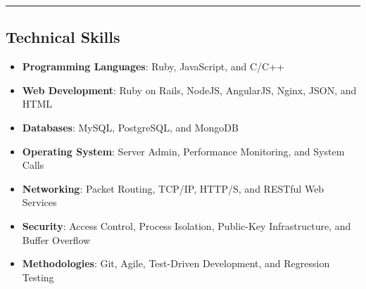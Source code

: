 \documentclass[12pt,letterpaper]{article}
\begin{document}


\noindent\rule{7.5in}{0.4pt}

\subsection*{Technical Skills}

\begin{itemize}

  \item\textbf{Programming Languages}: Ruby, JavaScript, and C/C++
  \item\textbf{Web Development}: Ruby on Rails, NodeJS, AngularJS, Nginx, JSON, and HTML
  \item\textbf{Databases}: MySQL, PostgreSQL, and MongoDB
  \item\textbf{Operating System}: Server Admin, Performance Monitoring, and System Calls
  \item\textbf{Networking}: Packet Routing, TCP/IP, HTTP/S, and RESTful Web Services
  \item\textbf{Security}: Access Control, Process Isolation, Public-Key Infrastructure, and Buffer Overflow
  \item\textbf{Methodologies}: Git, Agile, Test-Driven Development, and Regression Testing

\end{itemize}
\end{document}
